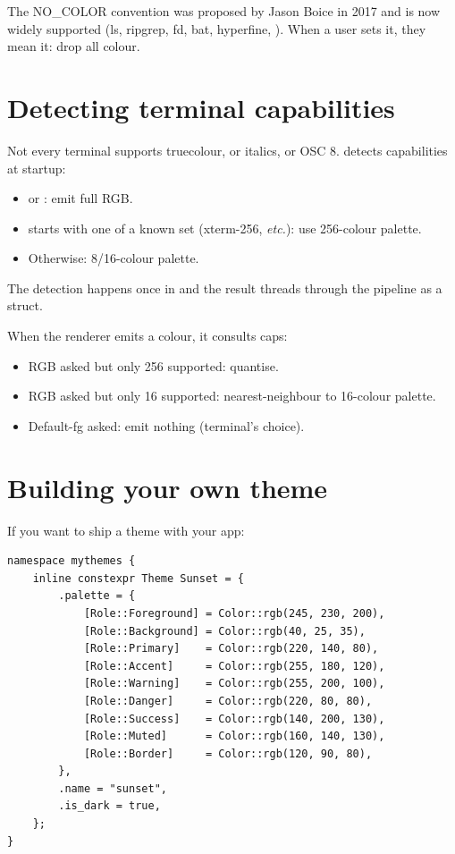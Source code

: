 \begin{aside}
The NO\_COLOR convention was proposed by Jason Boice in 2017 and
is now widely supported (ls, ripgrep, fd, bat, hyperfine,
\maya{}). When a user sets it, they mean it: drop all colour.
\end{aside}

\section{Detecting terminal capabilities}

Not every terminal supports truecolour, or italics, or OSC 8.
\maya{} detects capabilities at startup:

\begin{itemize}[leftmargin=*]
  \item {} or : emit
    full RGB.
  \item {} starts with one of a known set (xterm-256,
    \emph{etc.}): use 256-colour palette.
  \item Otherwise: 8/16-colour palette.
\end{itemize}

The detection happens once in
 and the result
threads through the pipeline as a  struct.

When the renderer emits a colour, it consults caps:

\begin{itemize}[leftmargin=*]
  \item RGB asked but only 256 supported: quantise.
  \item RGB asked but only 16 supported: nearest-neighbour to
    16-colour palette.
  \item Default-fg asked: emit nothing (terminal's choice).
\end{itemize}

\section{Building your own theme}

If you want to ship a theme with your app:

\begin{lstlisting}
namespace mythemes {
    inline constexpr Theme Sunset = {
        .palette = {
            [Role::Foreground] = Color::rgb(245, 230, 200),
            [Role::Background] = Color::rgb(40, 25, 35),
            [Role::Primary]    = Color::rgb(220, 140, 80),
            [Role::Accent]     = Color::rgb(255, 180, 120),
            [Role::Warning]    = Color::rgb(255, 200, 100),
            [Role::Danger]     = Color::rgb(220, 80, 80),
            [Role::Success]    = Color::rgb(140, 200, 130),
            [Role::Muted]      = Color::rgb(160, 140, 130),
            [Role::Border]     = Color::rgb(120, 90, 80),
        },
        .name = "sunset",
        .is_dark = true,
    };
}
\end{lstlisting}


